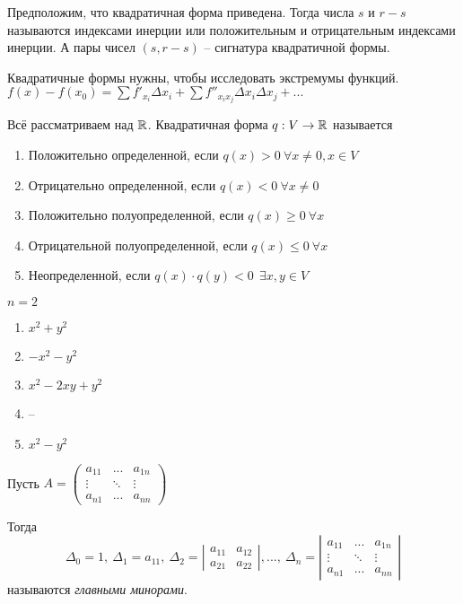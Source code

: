 \begin{Def}
	Предположим, что квадратичная форма приведена. Тогда числа $s$ и $r-s$ называются индексами инерции или положительным и отрицательным индексами инерции. 
	А пары чисел $(s, r-s)$ -- сигнатура квадратичной формы. 
\end{Def} 

\begin{Rem}
	Квадратичные формы нужны, чтобы исследовать экстремумы функций. $f(x) - f(x_0) = \sum f'_{x_i} \Delta x_i + \sum f''_{x_ix_j} \Delta x_i \Delta x_j + ...$ 
\end{Rem}

\begin{Def}
	Всё рассматриваем над $\mathbb{R}$. Квадратичная форма $q: V \to \mathbb{R}$ называется 
	\begin{enumerate}
		\item Положительно определенной, если $q(x) > 0 \ \forall x \neq 0, x \in V$
		\item Отрицательно определенной, если $q(x) < 0 \ \forall x \neq 0$
		\item Положительно полуопределенной, если $q(x) \geqslant 0 \ \forall x$
		\item Отрицательной полуопределенной, если $q(x) \leqslant 0 \ \forall x$
		\item Неопределенной, если $q(x) \cdot q(y) < 0 \ \ \exists x, y \in V$
	\end{enumerate}
\end{Def} 

\begin{Example}
	$n = 2$
	\begin{enumerate}
		\item $x^2 + y^2$
		\item $-x^2 - y^2$
		\item $x^2 - 2xy + y^2$
		\item --
		\item $x^2 - y^2$
	\end{enumerate}	
\end{Example}


\begin{Def}
	Пусть $A = \left(
		\begin{array}{cccc}
			a_{11} & ... &  a_{1n}\\
			\vdots & \ddots & \vdots\\
			a_{n1} & ... & a_{nn}
		\end{array}
	\right)$

	Тогда 
	\[\Delta_0 = 1, \ \Delta_1 = a_{11}, \ \Delta_2 = \left| \begin{array}{cc}
		a_{11} & a_{12}\\
		a_{21} & a_{22}
	\end{array} \right|, ..., \ \Delta_n = \left| \begin{array}{ccc}
		a_{11} & ... & a_{1n}\\
		\vdots & \ddots & \vdots\\
		a_{n1} & ... & a_{nn}
	\end{array} \right|\]
	называются \textit{главными минорами}. 
\end{Def} 

